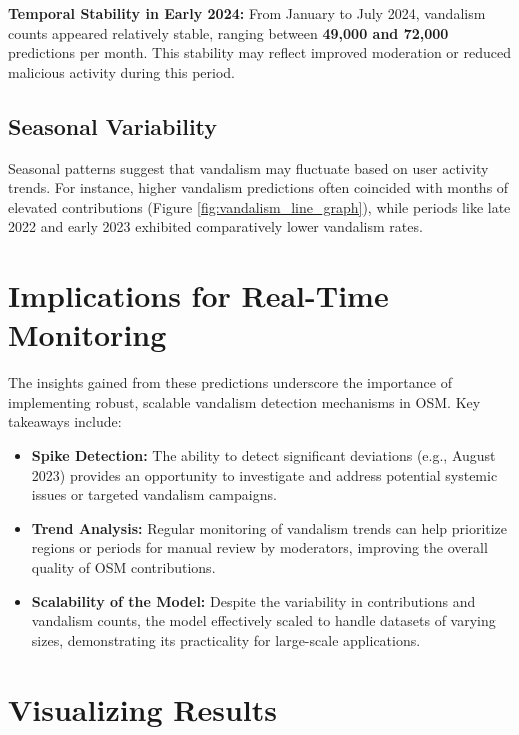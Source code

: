 \documentclass[
    13pt, %
    a4paper, %
    listof=totoc, %
    bibliography=totoc, %
    index=totoc, %
    headsepline
]{scrreprt}
\begin{document}
\textbf{Temporal Stability in Early 2024:} From January to July 2024, vandalism counts appeared relatively stable, ranging between \textbf{49,000 and 72,000} predictions per month. This stability may reflect improved moderation or reduced malicious activity during this period.

\subsection{Seasonal Variability}
Seasonal patterns suggest that vandalism may fluctuate based on user activity trends. For instance, higher vandalism predictions often coincided with months of elevated contributions (Figure \ref{fig:vandalism_line_graph}), while periods like late 2022 and early 2023 exhibited comparatively lower vandalism rates.

\section{Implications for Real-Time Monitoring}
The insights gained from these predictions underscore the importance of implementing robust, scalable vandalism detection mechanisms in OSM. Key takeaways include:
\begin{itemize}
    \item \textbf{Spike Detection:} The ability to detect significant deviations (e.g., August 2023) provides an opportunity to investigate and address potential systemic issues or targeted vandalism campaigns.
    \item \textbf{Trend Analysis:} Regular monitoring of vandalism trends can help prioritize regions or periods for manual review by moderators, improving the overall quality of OSM contributions.
    \item \textbf{Scalability of the Model:} Despite the variability in contributions and vandalism counts, the model effectively scaled to handle datasets of varying sizes, demonstrating its practicality for large-scale applications.
\end{itemize}

\section{Visualizing Results}
\end{document}
